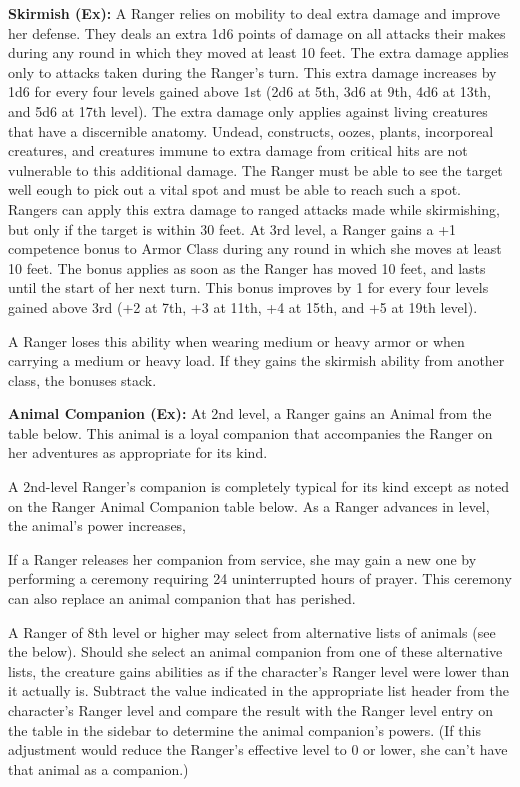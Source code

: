 \textbf{Skirmish (Ex):} A Ranger relies on mobility to deal extra damage and improve her defense. They deals an extra 1d6 points of damage on all attacks their makes during any round in which they moved at least 10 feet. The extra damage applies only to attacks taken during the Ranger’s turn. This extra damage increases by 1d6 for every four levels gained above 1st (2d6 at 5th, 3d6 at 9th, 4d6 at 13th, and 5d6 at 17th level). The extra damage only applies against living creatures that have a discernible anatomy. Undead, constructs, oozes, plants, incorporeal creatures, and creatures immune to extra damage from critical hits are not vulnerable to this additional damage. The Ranger must be able to see the target well eough to pick out a vital spot and must be able to reach such a spot. Rangers can apply this extra damage to ranged attacks made while skirmishing, but only if the target is within 30 feet. At 3rd level, a Ranger gains a +1 competence bonus to Armor Class during any round in which she moves at least 10 feet. The bonus applies as soon as the Ranger has moved 10 feet, and lasts until the start of her next turn.
This bonus improves by 1 for every four levels gained above 3rd (+2 at 7th, +3 at 11th, +4 at 15th, and +5 at 19th level).

A Ranger loses this ability when wearing medium or heavy armor or when carrying a medium or heavy load. If they gains the skirmish ability from another class, the bonuses stack.

\textbf{Animal Companion (Ex):} At 2nd level, a Ranger gains an Animal from the table below. This animal is a loyal companion that accompanies the Ranger on her adventures as appropriate for its kind.

A 2nd-level Ranger’s companion is completely typical for its kind except as noted on the Ranger Animal Companion table below. As a Ranger advances in level, the animal’s power increases,

If a Ranger releases her companion from service, she may gain a new one by performing a ceremony requiring 24 uninterrupted hours of prayer. This ceremony can also replace an animal companion that has perished.

A Ranger of 8th level or higher may select from alternative lists of animals (see the below). Should she select an animal companion from one of these alternative lists, the creature gains abilities as if the character’s Ranger level were lower than it actually is. Subtract the value indicated in the appropriate list header from the character’s Ranger level and compare the result with the Ranger level entry on the table in the sidebar to determine the animal companion’s powers. (If this adjustment would reduce the Ranger’s effective level to 0 or lower, she can’t have that animal as a companion.) 


